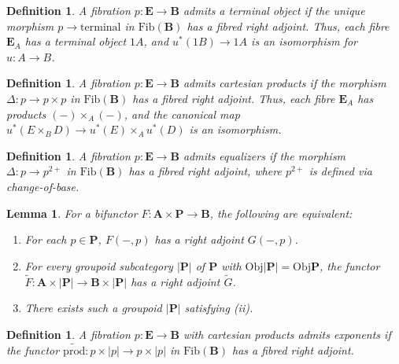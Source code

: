 \documentclass{article}
\theoremstyle{plain}
\newtheorem{lemma}[theorem]{Lemma}
\newtheorem{definition}[theorem]{Definition}
\theoremstyle{remark}
\begin{document}
\begin{definition}
\label{def:3.5}
A fibration $p : \mathbf{E} \to \mathbf{B}$ \emph{admits a terminal object} if the unique morphism $p \to \text{terminal}$ in $\text{Fib}(\mathbf{B})$ has a fibred right adjoint. Thus, each fibre $\mathbf{E}_A$ has a terminal object $1 A$, and $u^*(1 B) \to 1 A$ is an isomorphism for $u : A \to B$.
\end{definition}

\begin{definition}
\label{def:3.6}
A fibration $p : \mathbf{E} \to \mathbf{B}$ \emph{admits cartesian products} if the morphism $\Delta : p \to p \times p$ in $\text{Fib}(\mathbf{B})$ has a fibred right adjoint. Thus, each fibre $\mathbf{E}_A$ has products $(-) \times_A (-)$, and the canonical map $u^*(E \times_B D) \to u^*(E) \times_A u^*(D)$ is an isomorphism.
\end{definition}

\begin{definition}
\label{def:3.7}
A fibration $p : \mathbf{E} \to \mathbf{B}$ \emph{admits equalizers} if the morphism $\Delta : p \to p^{2+}$ in $\text{Fib}(\mathbf{B})$ has a fibred right adjoint, where $p^{2+}$ is defined via change-of-base.
\end{definition}

\begin{lemma}
\label{lem:3.8}
For a bifunctor $F : \mathbf{A} \times \mathbf{P} \to \mathbf{B}$, the following are equivalent:
\begin{enumerate}
    \item[(i)] For each $p \in \mathbf{P}$, $F(-, p)$ has a right adjoint $G(-, p)$.
    \item[(ii)] For every groupoid subcategory $|\mathbf{P}|$ of $\mathbf{P}$ with $\text{Obj}|\mathbf{P}| = \text{Obj} \mathbf{P}$, the functor $\tilde{F} : \mathbf{A} \times |\mathbf{P}| \to \mathbf{B} \times |\mathbf{P}|$ has a right adjoint $\tilde{G}$.
    \item[(iii)] There exists such a groupoid $|\mathbf{P}|$ satisfying (ii).
\end{enumerate}
\end{lemma}

\begin{definition}
\label{def:3.9}
A fibration $p : \mathbf{E} \to \mathbf{B}$ with cartesian products \emph{admits exponents} if the functor $\widetilde{\text{prod}} : p \times |p| \to p \times |p|$ in $\text{Fib}(\mathbf{B})$ has a fibred right adjoint.
\end{definition}
\end{document}

